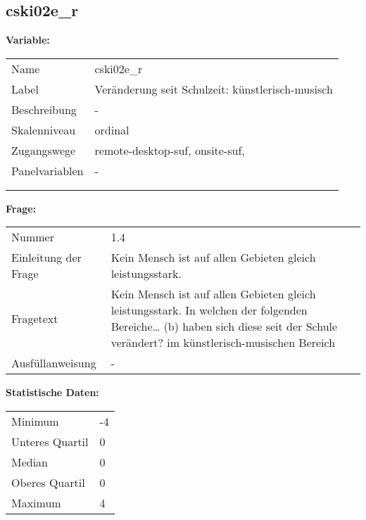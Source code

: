 	
	
	\subsection{cski02e\_r}
	\label{subSection:cski02e_r}

	\noindent\textbf{Variable:}\\
		\begin{tabular}{lL{11.3cm}}
			\label{tableVariable:cski02e_r}
			Name & cski02e\_r \\
			Label & Veränderung seit Schulzeit: künstlerisch-musisch \\
			Beschreibung & - \\
			Skalenniveau & ordinal \\
			Zugangswege &
				remote-desktop-suf,
				onsite-suf,
 \\
			Panelvariablen & -
			 \\
			 \\
 \\
		\end{tabular}

		\vspace*{1 cm}
		\noindent\textbf{Frage:}\\
		\begin{tabular}{lL{11.3cm}}
			\label{tableQuestion:cski02e_r}
			Nummer & 1.4 \\
			Einleitung der Frage & Kein Mensch ist auf allen Gebieten gleich leistungsstark. \\
			Fragetext & Kein Mensch ist auf allen Gebieten gleich leistungsstark. In welchen der folgenden Bereiche…
(b) haben sich diese seit der Schule verändert?
im künstlerisch-musischen Bereich \\
			Ausfüllanweisung & - \\
		\end{tabular}


		\vspace*{1 cm}
		\noindent\textbf{Statistische Daten:}\\
			\begin{tabular}{ll}
				\label{tableStatistics:cski02e_r}
					Minimum & -4 \\
					Unteres Quartil & 0 \\
					Median & 0 \\
					Oberes Quartil & 0 \\
					Maximum & 4 \\
			\end{tabular}



